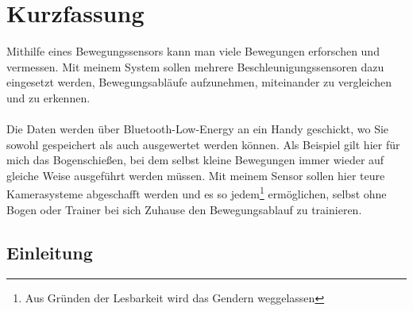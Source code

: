 \chapter[Kurzfassung]{Kurzfassung}

Mithilfe eines Bewegungssensors kann man viele 
Bewegungen erforschen und vermessen.
Mit meinem System sollen mehrere Beschleunigungssensoren 
dazu eingesetzt werden, Bewegungsabläufe aufzunehmen, 
miteinander zu vergleichen und zu erkennen.\\
\\
Die Daten werden über Bluetooth-Low-Energy an ein Handy 
geschickt, wo Sie sowohl gespeichert als auch ausgewertet 
werden können. Als Beispiel gilt hier für mich das Bogenschießen, 
bei dem selbst kleine Bewegungen immer wieder auf gleiche Weise 
ausgeführt werden müssen. Mit meinem Sensor sollen hier teure 
Kamerasysteme abgeschafft werden und es so jedem\footnote{Aus Gründen der Lesbarkeit wird das Gendern weggelassen} ermöglichen, 
selbst ohne Bogen oder Trainer bei sich Zuhause
den Bewegungsablauf zu trainieren.\\

\section{Einleitung}

